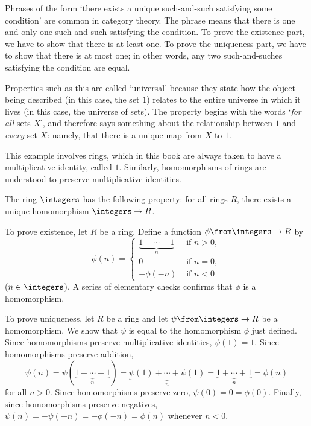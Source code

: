 Phrases of the form `there exists a unique%
%
% 
such-and-such satisfying some condition' are common in category theory.
The phrase means that there is one and only one such-and-such satisfying
the condition.  To prove the existence part, we have to show that there is
at least one.  To prove the uniqueness part, we have to show that there is
at most one; in other words, any two such-and-suches satisfying the
condition are equal.

Properties such as this are called `universal' because they state how the
object being described (in this case, the set $1$) relates to the entire
universe in which it lives (in this case, the universe of sets).  The
property begins with the words `\emph{for all} sets $X$', and therefore
says something about the relationship between $1$ and \emph{every} set $X$:
namely, that there is a unique map from $X$ to $1$.

\begin{iexample}        
\label{eg:univ-Z}
This example involves rings,%
%
%
which in this book are always taken to have a multiplicative identity,
called $1$.  Similarly, homomorphisms of rings are understood to preserve
multiplicative identities.

The ring $\integers$%
%
%
has the following property: for all rings $R$, there exists a unique
homomorphism $\integers \to R$.

To prove existence, let $R$ be a ring.  Define a function $\phi \from
\integers \to R$ by
\[
\phi(n)
=
\begin{cases}
\underbrace{1 + \cdots + 1}_n   &\text{ if } n > 0,     \\
0                               &\text{ if } n = 0,     \\
-\phi(-n)                       &\text{ if } n < 0
\end{cases}
\]
($n \in \integers$).  A series of elementary checks confirms that $\phi$ is
a homomorphism.

To prove uniqueness, let $R$ be a ring and let $\psi\from \integers \to R$
be a homomorphism.  We show that $\psi$ is equal to the homomorphism $\phi$
just defined.  Since homomorphisms preserve multiplicative identities,
$\psi(1) = 1$.  Since homomorphisms preserve addition,
\[
\psi(n) 
= 
\psi(\underbrace{1 + \cdots + 1}_n)
=
\underbrace{\psi(1) + \cdots + \psi(1)}_n
=
\underbrace{1 + \cdots + 1}_n
=
\phi(n)
\]
for all $n > 0$.  Since homomorphisms preserve zero, $\psi(0) = 0 = \phi(0)$.
Finally, since homomorphisms preserve negatives, $\psi(n) = -\psi(-n) =
-\phi(-n) = \phi(n)$ whenever $n < 0$.
\end{iexample}

